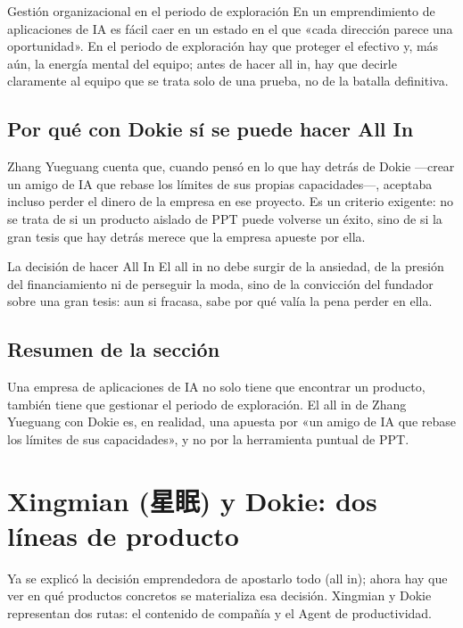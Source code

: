 \documentclass[a4paper]{article}
\begin{document}
\begin{knowledgebox}{Gestión organizacional en el periodo de exploración}
En un emprendimiento de aplicaciones de IA es fácil caer en un estado en el que «cada dirección parece una oportunidad». En el periodo de exploración hay que proteger el efectivo y, más aún, la energía mental del equipo; antes de hacer all in, hay que decirle claramente al equipo que se trata solo de una prueba, no de la batalla definitiva.
\end{knowledgebox}

\subsection{Por qué con Dokie sí se puede hacer All In}

Zhang Yueguang cuenta que, cuando pensó en lo que hay detrás de Dokie ---crear un amigo de IA que rebase los límites de sus propias capacidades---, aceptaba incluso perder el dinero de la empresa en ese proyecto. Es un criterio exigente: no se trata de si un producto aislado de PPT puede volverse un éxito, sino de si la gran tesis que hay detrás merece que la empresa apueste por ella.

\begin{importantbox}{La decisión de hacer All In}
El all in no debe surgir de la ansiedad, de la presión del financiamiento ni de perseguir la moda, sino de la convicción del fundador sobre una gran tesis: aun si fracasa, sabe por qué valía la pena perder en ella.
\end{importantbox}

\subsection{Resumen de la sección}

Una empresa de aplicaciones de IA no solo tiene que encontrar un producto, también tiene que gestionar el periodo de exploración. El all in de Zhang Yueguang con Dokie es, en realidad, una apuesta por «un amigo de IA que rebase los límites de sus capacidades», y no por la herramienta puntual de PPT.
\section{Xingmian (星眠) y Dokie: dos líneas de producto}

Ya se explicó la decisión emprendedora de apostarlo todo (all in); ahora hay que ver en qué productos concretos se materializa esa decisión. Xingmian y Dokie representan dos rutas: el contenido de compañía y el Agent de productividad.
\end{document}
